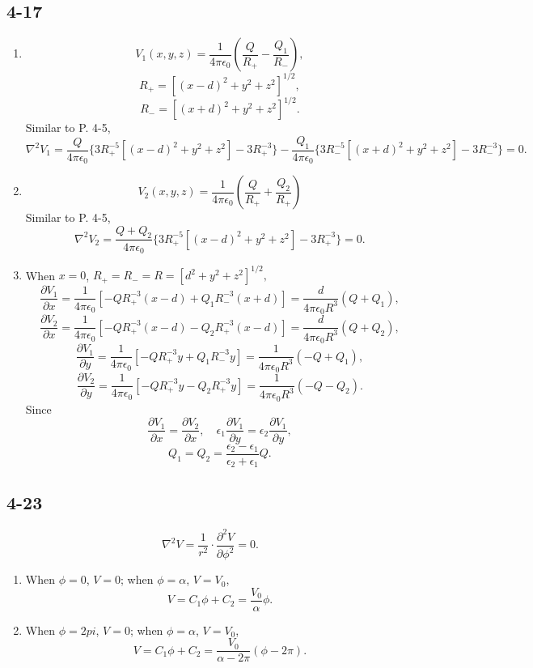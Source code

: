 \documentclass[6pt,a4paper]{article}
\begin{document}
\subsection{4-17}
\begin{enumerate}[label=\alph*)]
\item
$$V_1(x,y,z)=\frac{1}{4\pi\epsilon_0}\left(\frac{Q}{R_+}-\frac{Q_1}{R_-}\right),$$
$$R_+=[(x-d)^2+y^2+z^2]^{1/2},$$
$$R_-=[(x+d)^2+y^2+z^2]^{1/2}.$$
Similar to P. 4-5,
$$\nabla^2 V_1=\frac{Q}{4\pi\epsilon_0}\{3R_+^{-5}[(x-d)^2+y^2+z^2]-3R_+^{-3}\}-\frac{Q_1}{4\pi\epsilon_0}\{3R_-^{-5}[(x+d)^2+y^2+z^2]-3R_-^{-3}\}=0.$$
\item
$$V_2(x,y,z)=\frac{1}{4\pi\epsilon_0}\left(\frac{Q}{R_+}+\frac{Q_2}{R_+}\right)$$
Similar to P. 4-5,
$$\nabla^2 V_2=\frac{Q+Q_2}{4\pi\epsilon_0}\{3R_+^{-5}[(x-d)^2+y^2+z^2]-3R_+^{-3}\}=0.$$
\item
When $x=0$, $R_+=R_-=R=[d^2+y^2+z^2]^{1/2},$
$$\frac{\partial V_1}{\partial x}=\frac{1}{4\pi\epsilon_0}[-QR_+^{-3}(x-d)+Q_1R_-^{-3}(x+d)]=\frac{d}{4\pi\epsilon_0R^3}(Q+Q_1),$$
$$\frac{\partial V_2}{\partial x}=\frac{1}{4\pi\epsilon_0}[-QR_+^{-3}(x-d)-Q_2R_+^{-3}(x-d)]=\frac{d}{4\pi\epsilon_0R^3}(Q+Q_2),$$
$$\frac{\partial V_1}{\partial y}=\frac{1}{4\pi\epsilon_0}[-QR_+^{-3}y+Q_1R_-^{-3}y]=\frac{1}{4\pi\epsilon_0R^3}(-Q+Q_1),$$
$$\frac{\partial V_2}{\partial y}=\frac{1}{4\pi\epsilon_0}[-QR_+^{-3}y-Q_2R_+^{-3}y]=\frac{1}{4\pi\epsilon_0R^3}(-Q-Q_2).$$
Since
$$\frac{\partial V_1}{\partial x}=\frac{\partial V_2}{\partial x},\quad\epsilon_1\frac{\partial V_1}{\partial y}=\epsilon_2\frac{\partial V_1}{\partial y},$$
$$Q_1=Q_2=\frac{\epsilon_2-\epsilon_1}{\epsilon_2+\epsilon_1}Q.$$
\end{enumerate}

\subsection{4-23}
$$\nabla^2 V=\frac{1}{r^2}\cdot\frac{\partial^2V}{\partial\phi^2}=0.$$
\begin{enumerate}[label=\alph*)]
\item
When $\phi=0$, $V=0$; when $\phi=\alpha$, $V=V_0$,
$$V=C_1\phi+C_2=\frac{V_0}{\alpha}\phi.$$
\item
When $\phi=2pi$, $V=0$; when $\phi=\alpha$, $V=V_0$,
$$V=C_1\phi+C_2=\frac{V_0}{\alpha-2\pi}(\phi-2\pi).$$
\end{enumerate}
\end{document}
